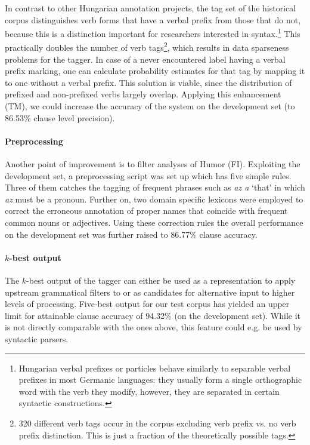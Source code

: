 In contrast to other Hungarian annotation projects, the tag set of the historical corpus distinguishes verb forms that have a verbal prefix from those that do not, because this is a distinction important for researchers interested in syntax.\footnote{Hungarian verbal prefixes or particles behave similarly to separable verbal prefixes in most Germanic languages: they usually form a single orthographic word with the verb they modify, however, they are separated in certain syntactic constructions.} 
This practically doubles the number of verb tags\footnote{320 different verb tags occur in the corpus excluding verb prefix vs. no verb prefix distinction. This is just a fraction of the theoretically possible tags.}, which results in data sparseness problems for the tagger. 
In case of a never encountered label having a verbal prefix marking, one can calculate probability estimates for that tag by mapping it to one without a verbal prefix. 
This solution is viable, since the distribution of prefixed and non-prefixed verbs largely overlap. 
Applying this enhancement (TM), we could increase the accuracy of the system on the development set (to 86.53\% clause level precision).

\paragraph{Preprocessing}

Another point of improvement is to filter analyses of Humor (FI). 
Exploiting the development set, a preprocessing script was set up which has five simple rules. 
Three of them catches the tagging of frequent phrases such as \emph{az a} `that' in which \emph{az} must be a pronoun. 
Further on, two domain specific lexicons were employed to correct the erroneous annotation of proper names that coincide with frequent common nouns or adjectives. 
Using these correction rules the overall performance on the development set was further raised to 86.77\% clause accuracy.



\paragraph{$k$-best output}
The $k$-best output of the tagger can either be used as a representation to apply upstream grammatical filters to or as candidates for alternative input to higher levels of processing. 
Five-best output for our test corpus has yielded an upper limit for attainable clause accuracy of 94.32\% (on the development set). 
While it is not directly comparable with the ones above, this feature could e.g. be used by syntactic parsers.


